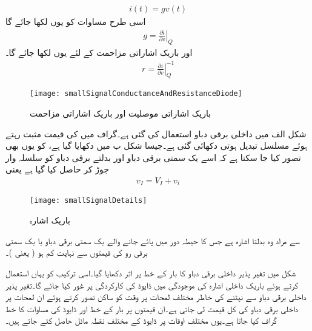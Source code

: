 \begin{align} \label{مساوات_موصلیت_نما_کے_استعمال_سے_رو_کا_حصول}
i(t)= g v(t)
\end{align}
اسی طرح مساوات   کو یوں لکھا جائے گا
\begin{align} \label{مساوات_موصلیت_نما_کی_تعریف}
g = \left .  \frac{\partial  i}{\partial v} \right |_Q
\end{align}
اور باریک اشاراتی مزاحمت  کے لئے یوں لکھا جائے گا۔
\begin{align}
r=\left . \frac{\partial i}{\partial v} \right|_Q ^{-1}
\end{align}

\begin{figure}
\centering
\texttt{[image: smallSignalConductanceAndResistanceDiode]}
\caption{ باریک اشاراتی موصلیت اور باریک اشاراتی مزاحمت}
\label{شکل_ڈایوڈ_کا_باریک_اشاراتی_مزاحمت}
\end{figure}
 \label{حصہ_باریک_اشاراتی_تجزیہ}
شکل  الف میں داخلی برقی دباو  استعمال کی گئی ہے۔گراف میں     کی قیمت مثبت رہتے ہوئے مسلسل تبدیل ہوتی دکھائی گئی ہے۔جیسا شکل  ب میں دکھایا گیا ہے،   کو یوں بھی تصور کیا جا سکتا ہے کہ اسے یک سمتی برقی دباو   اور بدلتے برقی دباو   کو سلسلہ وار جوڑ کر حاصل کیا گیا ہے یعنی
\begin{align}
v_I = V_I+v_i
\end{align}
%
\begin{figure}
\centering
\texttt{[image: smallSignalDetails]}
\caption{باریک اشارہ}
\label{شکل_باریک_اشارہ}
\end{figure}

  سے مراد وہ بدلتا اشارہ ہے جس کا حیطہ دور میں پائے جانے والے یک سمتی برقی دباو یا  یک سمتی برقی رو کی قیمتوں سے نہایت کم ہو ( یعنی  )۔

شکل   میں تغیر پذیر داخلی برقی دباو کا بار کے خط پر اثر دکھایا گیا۔اسی ترکیب کو یہاں استعمال کرتے ہوئے باریک داخلی اشارہ   کی موجودگی میں ڈایوڈ کی کارکردگی پر غور کیا جائے گا۔تغیر پذیر داخلی برقی دباو   سے نپٹنے کی خاطر مختلف لمحات پر وقت کو ساکن تصور کرتے ہوئے ان لمحات پر داخلی برقی دباو کی کل قیمت لی جاتی ہے۔ان قیمتوں پر بار کے خط اور ڈایوڈ کی مساوات کا خط گراف کیا جاتا ہے۔یوں مختلف اوقات پر ڈایوڈ کے مختلف نقطہ مائل   حاصل کئے جاتے ہیں۔

